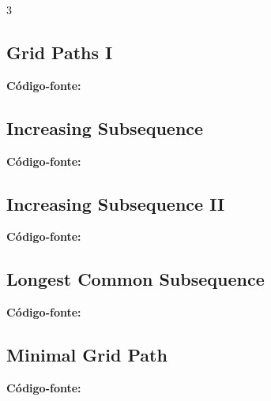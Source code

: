 \documentclass[8pt]{extarticle}
\begin{document}
\begin{multicols*}{3}
\subsection{Grid Paths I}
\begin{caixaenunciado}

\end{caixaenunciado}
\vspace{0.3cm}
\noindent\textbf{Código-fonte:}


\subsection{Increasing Subsequence}
\begin{caixaenunciado}

\end{caixaenunciado}
\vspace{0.3cm}
\noindent\textbf{Código-fonte:}


\subsection{Increasing Subsequence II}
\begin{caixaenunciado}

\end{caixaenunciado}
\vspace{0.3cm}
\noindent\textbf{Código-fonte:}


\subsection{Longest Common Subsequence}
\begin{caixaenunciado}

\end{caixaenunciado}
\vspace{0.3cm}
\noindent\textbf{Código-fonte:}


\subsection{Minimal Grid Path}
\begin{caixaenunciado}

\end{caixaenunciado}
\vspace{0.3cm}
\noindent\textbf{Código-fonte:}



\end{multicols*}
\end{document}
